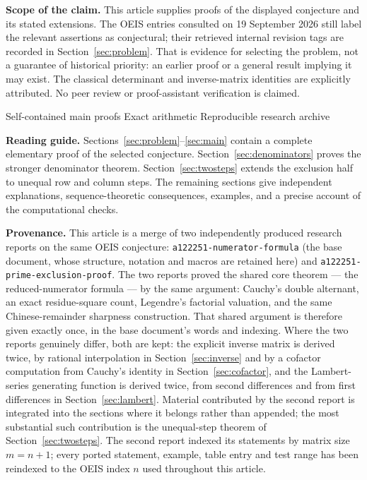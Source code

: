 \documentclass[11pt,a4paper]{article}
\numberwithin{equation}{section}
\theoremstyle{definition}
\theoremstyle{remark}
\begin{document}
\begin{titlepage}
\begin{resultbox}
\small\textbf{Scope of the claim.} This article supplies proofs of the displayed conjecture and its stated extensions. The OEIS entries consulted on 19 September 2026 still label the relevant assertions as conjectural; their retrieved internal revision tags are recorded in Section~\ref{sec:problem}. That is evidence for selecting the problem, not a guarantee of historical priority: an earlier proof or a general result implying it may exist. The classical determinant and inverse-matrix identities are explicitly attributed. No peer review or proof-assistant verification is claimed.
\end{resultbox}
\vfill
{\small\color{teal}Self-contained main proofs \;\textbullet\; Exact arithmetic \;\textbullet\; Reproducible research archive\par}
\end{titlepage}
\hypersetup{pageanchor=true}

\tableofcontents
\vspace{5mm}
\begin{resultbox}
\textbf{Reading guide.} Sections~\ref{sec:problem}--\ref{sec:main} contain a complete elementary proof of the selected conjecture. Section~\ref{sec:denominators} proves the stronger denominator theorem. Section~\ref{sec:twosteps} extends the exclusion half to unequal row and column steps. The remaining sections give independent explanations, sequence-theoretic consequences, examples, and a precise account of the computational checks.
\end{resultbox}
\begin{resultbox}
\textbf{Provenance.} This article is a merge of two independently produced research reports on the same OEIS conjecture: \texttt{a122251-numerator-formula} (the base document, whose structure, notation and macros are retained here) and \texttt{a122251-prime-exclusion-proof}. The two reports proved the shared core theorem --- the reduced-numerator formula --- by the same argument: Cauchy's double alternant, an exact residue-square count, Legendre's factorial valuation, and the same Chinese-remainder sharpness construction. That shared argument is therefore given exactly once, in the base document's words and indexing. Where the two reports genuinely differ, both are kept: the explicit inverse matrix is derived twice, by rational interpolation in Section~\ref{sec:inverse} and by a cofactor computation from Cauchy's identity in Section~\ref{sec:cofactor}, and the Lambert-series generating function is derived twice, from second differences and from first differences in Section~\ref{sec:lambert}. Material contributed by the second report is integrated into the sections where it belongs rather than appended; the most substantial such contribution is the unequal-step theorem of Section~\ref{sec:twosteps}. The second report indexed its statements by matrix size $m=n+1$; every ported statement, example, table entry and test range has been reindexed to the OEIS index $n$ used throughout this article.
\end{resultbox}
\newpage
{}
\end{document}
